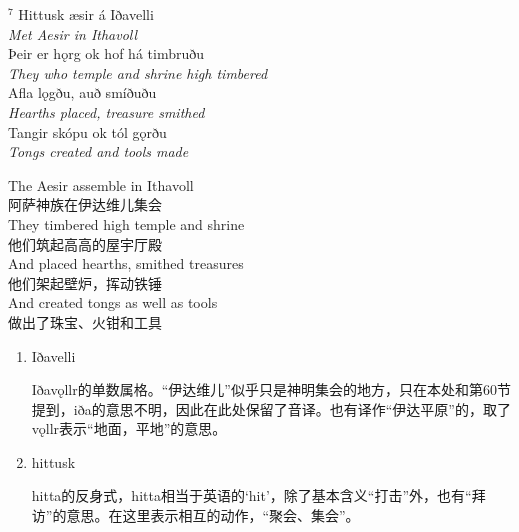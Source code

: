 \begin{paracol}{2}
    \noindent
    $^7 $ Hittusk æsir á Iðavelli\\
    \textit{Met Aesir in Ithavoll}\\
    Þeir er hǫrg ok hof há timbruðu\\
    \textit{They who temple and shrine high timbered}\\
    Afla lǫgðu, auð smíðuðu\\
    \textit{Hearths placed, treasure smithed}\\
    Tangir skópu ok tól gǫrðu\\
    \textit{Tongs created and tools made}\\

    \switchcolumn

    \noindent
    The Aesir assemble in Ithavoll\\
    阿萨神族在伊达维儿集会\\
    They timbered high temple and shrine\\
    他们筑起高高的屋宇厅殿\\
    And placed hearths, smithed treasures\\
    他们架起壁炉，挥动铁锤\\
    And created tongs as well as tools\\
    做出了珠宝、火钳和工具\\
\end{paracol}

\begin{grammar*}{}
    \begin{enumerate}[leftmargin=*]
        \item Iðavelli

              Iðav\k{o}llr的单数属格。“伊达维儿”似乎只是神明集会的地方，只在本处和第60节提到，iða的意思不明，因此在此处保留了音译。也有译作“伊达平原”的，取了v\k{o}llr表示“地面，平地”的意思。

        \item hittusk

              hitta的反身式，hitta相当于英语的`hit'，除了基本含义“打击”外，也有“拜访”的意思。在这里表示相互的动作，“聚会、集会”。
    \end{enumerate}
\end{grammar*}
\medskip %

